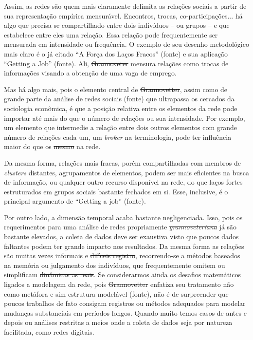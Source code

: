 Assim, as redes são quem mais claramente delimita as relações sociais
a partir de sua representação empírica mensurável. Encontros, trocas,
co-participações... há algo que precisa \sout{se} compartilhado entre dois indivíduos -- ou grupos -- e que estabelece entre eles uma relação. Essa relação pode frequentemente ser mensurada em intensidade ou frequência. O exemplo de seu desenho metodológico mais claro é o já citado ``A Força dos Laços Fracos'' (fonte) e sua aplicação ``Getting a Job'' (fonte). Ali, \sout{Grannoveter} mensura relações como trocas de informações visando a obtenção de uma vaga de emprego.

Mas há algo mais, pois o elemento central de \sout{Grannovetter}, assim como
de grande parte da análise de redes sociais (fonte) que ultrapassa
os cercados da sociologia econômica, é que a posição relativa entre os
elementos da rede pode importar até mais do que o número de relações ou sua intensidade.
Por exemplo, um elemento que intermedie a relação entre dois  outros elementos com grande número de relações cada um, um \emph{broker} na terminologia, pode ter
influência maior do que os \sout{mesmo} na rede.

Da mesma forma, relações mais fracas, porém compartilhadas com membros
de \emph{clusters} distantes, agrupamentos de elementos, podem ser mais
eficientes na busca de informação, ou qualquer outro recurso disponível na rede, do que laços fortes estruturados
em grupos sociais bastante fechados em si. Esse, inclusive, é o principal argumento de ``Getting a job'' (fonte).

Por outro lado, a dimensão temporal acaba bastante negligenciada. Isso, pois os requerimentos para uma análise de redes propriamente \emph{\sout{grannoveteriana}} já são bastante elevados, a coleta de dados deve ser exaustiva visto que poucos dados faltantes podem ter grande impacto nos resultados.
Da mesma forma as relações são muitas vezes informais e \sout{difíceis registro}, recorrendo-se a métodos baseados na memória ou julgamento
dos indivíduos, que frequentemente omitem ou simplificam \sout{dinâmicas as reais}. Se considerarmos ainda os desafios matemáticos ligados a modelagem da rede, pois \sout{Grannovetter} enfatiza seu tratamento não como metáfora e sim estrutura modelável (fonte), não é de surpreender que poucos
trabalhos de fato consigam registros ou métodos adequados para modelar mudanças substanciais em períodos longos. Quando muito temos casos de antes e depois ou análises restritas a meios onde a coleta de dados seja por natureza facilitada, como redes digitais.

